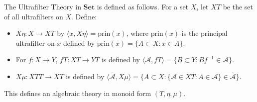 The Ultrafilter Theory in $\mathbf{Set}$ is defined as follows. For a set $X$, let $XT$ be the set of all ultrafilters on $X$. Define:
\begin{itemize}
\item $X\eta: X \longrightarrow XT$ by $\langle x, X\eta \rangle = \mathrm{prin}(x)$, where $\mathrm{prin}(x)$ is the principal ultrafilter on $x$ defined by $\mathrm{prin}(x) = \{A \subset X : x \in A\}$.
\item For $f: X \longrightarrow Y$, $fT: XT \longrightarrow YT$ is defined by $\langle \mathcal{A}, fT \rangle = \{B \subset Y : Bf^{-1} \in \mathcal{A}\}$.
\item $X\mu: XTT \longrightarrow XT$ is defined by $\langle \bar{\mathcal{A}}, X\mu \rangle = \{A \subset X : \{\mathcal{A} \in XT : A \in \mathcal{A}\} \in \bar{\mathcal{A}}\}$.
\end{itemize}
This defines an algebraic theory in monoid form $(T, \eta, \mu)$.
